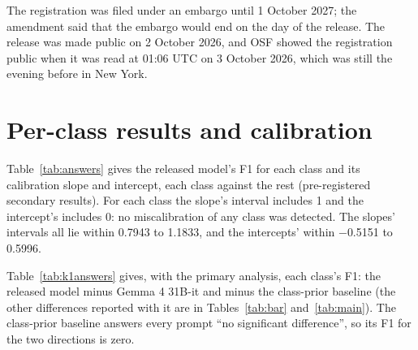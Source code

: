\documentclass[11pt,letterpaper]{article}
\begin{document}
The registration was filed under an embargo until 1 October 2027; the amendment said that the embargo would end on the day of the release. The release was made public on 2 October 2026, and OSF showed the registration public when it was read at 01:06 UTC on 3 October 2026, which was still the evening before in New York.

\section{Per-class results and calibration}
\label{app:answers}

Table~\ref{tab:answers} gives the released model's F1 for each class and its calibration slope and intercept, each class against the rest (pre-registered secondary results). For each class the slope's interval includes 1 and the intercept's includes 0: no miscalibration of any class was detected. The slopes' intervals all lie within 0.7943 to 1.1833, and the intercepts' within $-$0.5151 to 0.5996.

\begin{table}[H]
\centering\footnotesize
\caption{The released model on Evidence Inference 2.0's test split, each class against the rest: F1, and the calibration slope (the coefficient of a logistic regression of the class's indicator on the logit of its calibrated probability; 1 is ideal) and intercept (with that logit as an offset; 0 is ideal), each with its 95 percent interval from 1,000 article resamples.}
\label{tab:answers}

\end{table}

Table~\ref{tab:k1answers} gives, with the primary analysis, each class's F1: the released model minus Gemma 4 31B-it and minus the class-prior baseline (the other differences reported with it are in Tables~\ref{tab:bar} and~\ref{tab:main}). The class-prior baseline answers every prompt ``no significant difference'', so its F1 for the two directions is zero.

\begin{table}[H]
\centering\footnotesize
\caption{Per-class F1, reported with the primary analysis: the F1 of the released model on the 1,218 test prompts, and its difference from Gemma 4 31B-it's and from the class-prior baseline's, each with its 95 percent interval from 1,000 article resamples. \textsuperscript{\dag}No difference was detected: the interval includes zero.}
\label{tab:k1answers}

\end{table}
\end{document}
